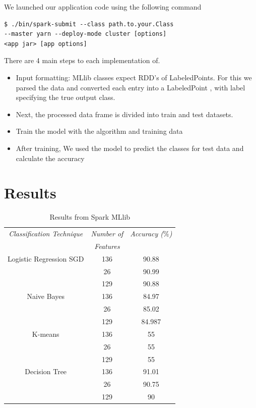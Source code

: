 \documentclass[9pt,twocolumn,twoside]{../../styles/osajnl}
\begin{document}
We launched our application code using the following command
\begin{verbatim}
$ ./bin/spark-submit --class path.to.your.Class 
--master yarn --deploy-mode cluster [options] 
<app jar> [app options]
\end{verbatim}

 There are 4 main steps to each implementation of.
 \begin{itemize}
  \item Input formatting: MLlib classes expect RDD’s of LabeledPoints. For this we parsed the data and converted each entry into a LabeledPoint , with label specifying the true output class.
\item Next, the processed data frame is divided into train and test datasets.
\item Train the model with the algorithm and training data
\item After  training, We used the model to predict the classes for test data and calculate the accuracy
 \end{itemize}

\section{Results}
\begin{table}[h!]
\centering
\caption{Results from Spark MLlib}
 \begin{tabular}{|c c c|} 
 \hline
 \textit{Classification Technique} & \textit{Number of} & \textit{Accuracy ($\%$)}\\
 & \textit{Features} &\\
 \hline
 \hline 
  Logistic Regression SGD\cite{www-mllibsgd} & 136 & 90.88
 \\  & 26 & 90.99\\
  & 129 & 90.88\\
 \hline 
  Naive Bayes\cite{www-mllibgnb} & 136 & 84.97
 \\  & 26 & 85.02\\
  & 129 & 84.987
\\ 
 \hline 
   K-means\cite{www-mllibkmeans} & 136 & 55
 \\ 
   & 26 & 55\\
  & 129 & 55\\ 
 \hline 
Decision Tree\cite{www-mllibdtc} & 136 & 91.01 \\ & 26 & 90.75\\
  & 129 & 90\\
\hline 
\end{tabular}
\label{table:mllib}
\end{table}
\end{document}
